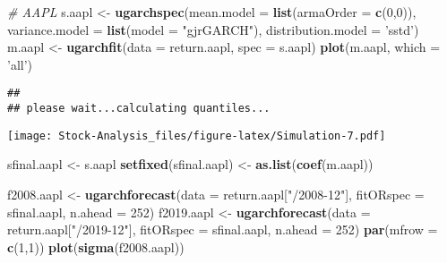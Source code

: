 \documentclass[
]{article}
\newenvironment{Shaded}{\begin{snugshade}}{\end{snugshade}}
\newcommand{\CommentTok}[1]{\textcolor[rgb]{0.56,0.35,0.01}{\textit{#1}}}
\newcommand{\DataTypeTok}[1]{\textcolor[rgb]{0.13,0.29,0.53}{#1}}
\newcommand{\DecValTok}[1]{\textcolor[rgb]{0.00,0.00,0.81}{#1}}
\newcommand{\KeywordTok}[1]{\textcolor[rgb]{0.13,0.29,0.53}{\textbf{#1}}}
\newcommand{\NormalTok}[1]{#1}
\newcommand{\StringTok}[1]{\textcolor[rgb]{0.31,0.60,0.02}{#1}}
\begin{document}
\begin{Shaded}
\begin{Highlighting}[]
\CommentTok{# AAPL}
\NormalTok{s.aapl <-}\StringTok{ }\KeywordTok{ugarchspec}\NormalTok{(}\DataTypeTok{mean.model =} \KeywordTok{list}\NormalTok{(}\DataTypeTok{armaOrder =} \KeywordTok{c}\NormalTok{(}\DecValTok{0}\NormalTok{,}\DecValTok{0}\NormalTok{)),}
                \DataTypeTok{variance.model =} \KeywordTok{list}\NormalTok{(}\DataTypeTok{model =} \StringTok{"gjrGARCH"}\NormalTok{),}
                \DataTypeTok{distribution.model =} \StringTok{'sstd'}\NormalTok{)}
\NormalTok{m.aapl <-}\StringTok{ }\KeywordTok{ugarchfit}\NormalTok{(}\DataTypeTok{data =}\NormalTok{ return.aapl, }\DataTypeTok{spec =}\NormalTok{ s.aapl)}
\KeywordTok{plot}\NormalTok{(m.aapl, }\DataTypeTok{which =} \StringTok{'all'}\NormalTok{)}
\end{Highlighting}
\end{Shaded}

\begin{verbatim}
## 
## please wait...calculating quantiles...
\end{verbatim}

\texttt{[image: Stock-Analysis\_files/figure-latex/Simulation-7.pdf]}

\begin{Shaded}
\begin{Highlighting}[]
\NormalTok{sfinal.aapl <-}\StringTok{ }\NormalTok{s.aapl}
\KeywordTok{setfixed}\NormalTok{(sfinal.aapl) <-}\StringTok{ }\KeywordTok{as.list}\NormalTok{(}\KeywordTok{coef}\NormalTok{(m.aapl))}

\NormalTok{f2008.aapl <-}\StringTok{ }\KeywordTok{ugarchforecast}\NormalTok{(}\DataTypeTok{data =}\NormalTok{ return.aapl[}\StringTok{"/2008-12"}\NormalTok{],}
                        \DataTypeTok{fitORspec =}\NormalTok{ sfinal.aapl,}
                        \DataTypeTok{n.ahead =} \DecValTok{252}\NormalTok{)}
\NormalTok{f2019.aapl <-}\StringTok{ }\KeywordTok{ugarchforecast}\NormalTok{(}\DataTypeTok{data =}\NormalTok{ return.aapl[}\StringTok{"/2019-12"}\NormalTok{],}
                        \DataTypeTok{fitORspec =}\NormalTok{ sfinal.aapl,}
                        \DataTypeTok{n.ahead =} \DecValTok{252}\NormalTok{)}
\KeywordTok{par}\NormalTok{(}\DataTypeTok{mfrow =} \KeywordTok{c}\NormalTok{(}\DecValTok{1}\NormalTok{,}\DecValTok{1}\NormalTok{))}
\KeywordTok{plot}\NormalTok{(}\KeywordTok{sigma}\NormalTok{(f2008.aapl))}
\end{Highlighting}
\end{Shaded}
\end{document}
